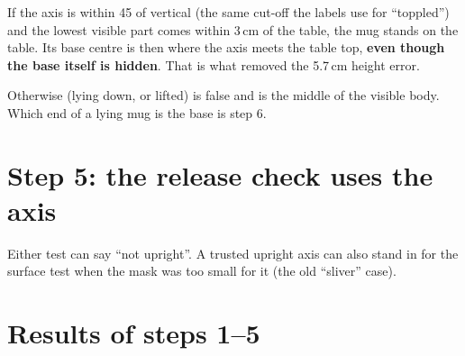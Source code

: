 \documentclass[11pt,a4paper]{article}
\newcommand{\code}[1]{\texttt{\detokenize{#1}}}
\begin{document}
If the axis is within 45\textdegree{} of vertical (the same cut-off the labels use for
``toppled'') and the lowest visible part comes within 3\,cm of the table, the mug stands on
the table. Its base centre is then where the axis meets the table top, \textbf{even though the
base itself is hidden}. That is what removed the 5.7\,cm height error.

Otherwise (lying down, or lifted) \code{base_known} is false and \code{position} is the middle
of the visible body. Which end of a lying mug is the base is step 6.

\section{Step 5: the release check uses the axis}

\begin{center}
\end{center}

Either test can say ``not upright''. A trusted upright axis can also stand in for the surface
test when the mask was too small for it (the old ``sliver'' case).

\section{Results of steps 1--5}\label{sec:results15}
\end{document}
